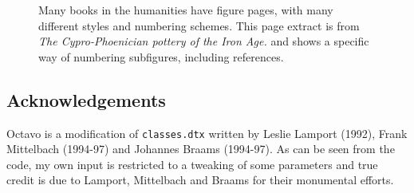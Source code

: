 \begin{figure}[htp]
\centering
{\color{thegray}
}
\caption{Many books in the humanities have figure pages, with many different styles and numbering schemes. This page extract is from \textit{The Cypro-Phoenician pottery of the Iron Age. }  \cite{schreiber1971} and shows a specific way of numbering subfigures, including references.}
\end{figure}
\clearpage



 \subsection{Acknowledgements}

 Octavo is a modification of \texttt{classes.dtx} written by Leslie Lamport (1992),
 Frank Mittelbach (1994-97) and Johannes Braams (1994-97). As can be seen
 from the code, my own input is restricted to a tweaking of some parameters
 and true credit is due to Lamport, Mittelbach and Braams for their
 monumental efforts.

